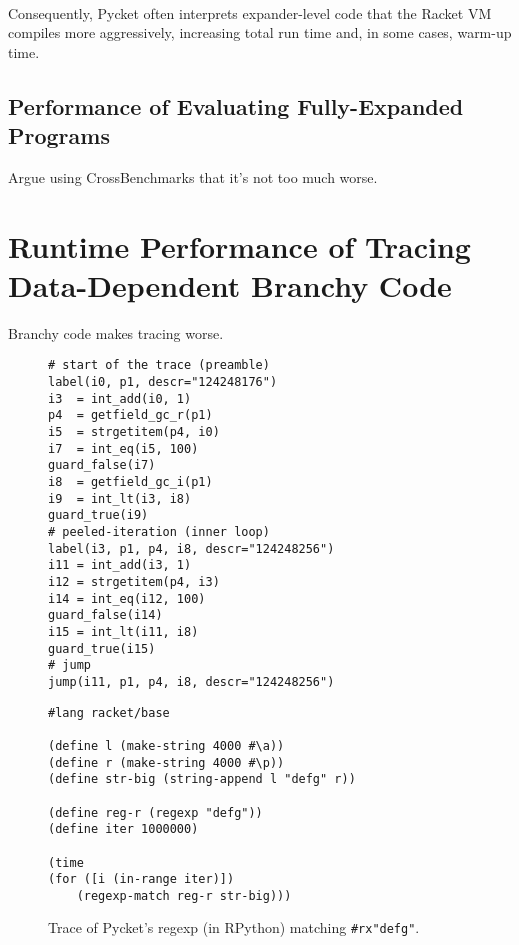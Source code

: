 			\paragraph{}%
			Consequently, Pycket often interprets expander-level code that the Racket VM compiles more aggressively, increasing total run time and, in some cases, warm-up time.

		\subsection{Performance of Evaluating Fully-Expanded Programs}

			\begin{mainpoint}
				Argue using CrossBenchmarks that it's not too much worse.
			\end{mainpoint}

	\section{Runtime Performance of Tracing Data-Dependent Branchy Code}
		\begin{mainpoint}
			Branchy code makes tracing worse.
		\end{mainpoint}

	\begin{figure}[tbp]
		\centering
\begin{minipage}{0.9\textwidth}
\begin{lstlisting}[language=rptrace]
# start of the trace (preamble)
label(i0, p1, descr="124248176")
i3  = int_add(i0, 1)
p4  = getfield_gc_r(p1)
i5  = strgetitem(p4, i0)
i7  = int_eq(i5, 100)
guard_false(i7)
i8  = getfield_gc_i(p1)
i9  = int_lt(i3, i8)
guard_true(i9)
# peeled-iteration (inner loop)
label(i3, p1, p4, i8, descr="124248256")
i11 = int_add(i3, 1)
i12 = strgetitem(p4, i3)
i14 = int_eq(i12, 100)
guard_false(i14)
i15 = int_lt(i11, i8)
guard_true(i15)
# jump
jump(i11, p1, p4, i8, descr="124248256")
\end{lstlisting}
\end{minipage}

		\vspace{0.8em} %

		\begin{minipage}{0.9\textwidth}
\begin{lstlisting}[language=racket]
#lang racket/base

(define l (make-string 4000 #\a))
(define r (make-string 4000 #\p))
(define str-big (string-append l "defg" r))

(define reg-r (regexp "defg"))
(define iter 1000000)

(time
(for ([i (in-range iter)])
	(regexp-match reg-r str-big)))
\end{lstlisting}
		\end{minipage}

		\caption{\small Trace of Pycket’s regexp (in RPython) matching
				{\tt\#rx"defg"}.}
		\label{fig:regexp-trace}
	\end{figure}



